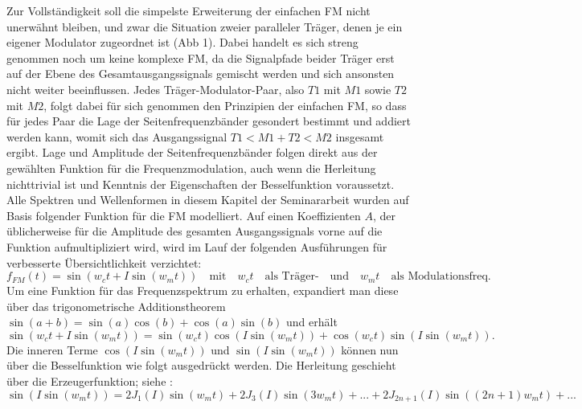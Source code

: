 Zur Vollständigkeit soll die simpelste Erweiterung der einfachen FM nicht unerwähnt bleiben, und zwar die Situation zweier paralleler Träger, denen je ein eigener Modulator zugeordnet ist (Abb 1). Dabei handelt es sich streng genommen noch um keine komplexe FM, da die Signalpfade beider Träger erst auf der Ebene des Gesamtausgangssignals gemischt werden und sich ansonsten nicht weiter beeinflussen. Jedes Träger-Modulator-Paar, also $T1$ mit $M1$ sowie $T2$ mit $M2$, folgt dabei für sich genommen den Prinzipien der einfachen FM, so dass für jedes Paar die Lage der Seitenfrequenzbänder gesondert bestimmt und addiert werden kann, womit sich das Ausgangssignal $T1<M1 + T2<M2$ insgesamt ergibt. Lage und Amplitude der Seitenfrequenzbänder folgen direkt aus der gewählten Funktion für die Frequenzmodulation, auch wenn die Herleitung nichttrivial ist und Kenntnis der Eigenschaften der Besselfunktion voraussetzt. \\
Alle Spektren und Wellenformen in diesem Kapitel der Seminararbeit wurden auf Basis folgender Funktion für die FM modelliert. Auf einen Koeffizienten $A$, der üblicherweise für die Amplitude des gesamten Ausgangssignals vorne auf die Funktion aufmultipliziert wird, wird im Lauf der folgenden Ausführungen für verbesserte Übersichtlichkeit verzichtet:
\label{matze:simplefm}
\begin{equation} \label{eq:SimpleFM}
f_{FM}(t) = \sin(w_ct + I\sin(w_mt)) \quad \text{mit} \quad w_ct \quad \text{als Träger-} \quad \text{und} \quad w_mt \quad \text{als Modulationsfreq.}
\end{equation}
Um eine Funktion für das Frequenzspektrum zu erhalten, expandiert man diese über das trigonometrische Additionstheorem \begin{math} \sin(a + b) = \sin(a)\cos(b)+\cos(a)\sin(b) \end{math} und erhält
\begin{equation}\label{eq:BesselZwischenform}
\sin(w_ct + I\sin(w_mt)) = \sin(w_ct)\cos(I\sin(w_mt)) + \cos(w_ct)\sin(I\sin(w_mt)).
\end{equation}
Die inneren Terme \begin{math} \cos(I\sin(w_mt)) \end{math} und \begin{math} \sin(I\sin(w_mt)) \end{math} können nun über die Besselfunktion wie folgt ausgedrückt werden. Die Herleitung geschieht über die Erzeugerfunktion; siehe \cite[S.361, Satz~9.1.42 und Satz~9.1.43]{abramowitz}:
\begin{equation}\label{eq:Besselsin}
\sin(I\sin(w_mt)) = 2J_1(I)\sin(w_mt)+2J_3(I)\sin(3w_mt)+...+2J_{2n+1}(I)\sin((2n+1)w_mt)+...
\end{equation}
